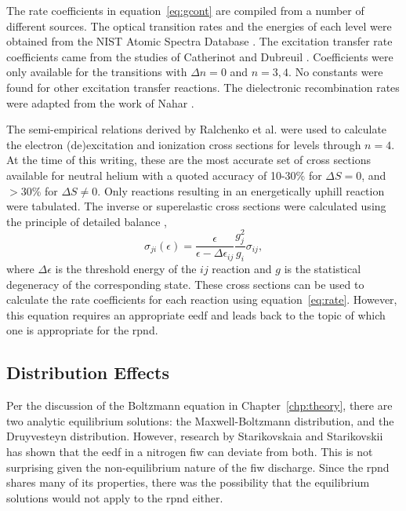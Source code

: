 The rate coefficients in equation~\ref{eq:gcont} are compiled from a number of
different sources. The optical transition rates and the energies of each level
were obtained from the NIST Atomic Spectra Database \cite{Kramida2012}. The
excitation transfer rate coefficients came from the studies of Catherinot and
Dubreuil \cite{Catherinot1981, Dubreuil1980}. Coefficients were only available
for the transitions with $\Delta n=0$ and $n=3,4$. No constants were found for
other excitation transfer reactions. The dielectronic recombination rates were
adapted from the work of Nahar \cite{Nahar2010}.

The semi-empirical relations derived by Ralchenko et al. \cite{Ralchenko2008}
were used to calculate the electron (de)excitation and ionization cross sections
for levels through $n=4$. At the time of this writing, these are the most
accurate set of cross sections available for neutral helium with a quoted
accuracy of 10-30\% for $\Delta S=0$, and $>30$\% for $\Delta S \neq 0$. Only
reactions resulting in an energetically uphill reaction were tabulated. The
inverse or superelastic cross sections were calculated using the principle of
detailed balance \cite{Kunze2009},
\begin{equation}
  \sigma_{ji}(\epsilon) = \frac{\epsilon}{\epsilon - \Delta\epsilon_{ij}}
    \frac{g_j^2}{g_i}\sigma_{ij},
\end{equation}
where $\Delta\epsilon$ is the threshold energy of the $ij$ reaction and $g$ is
the statistical degeneracy of the corresponding state. These cross sections can
be used to calculate the rate coefficients for each reaction using
equation~\ref{eq:rate}. However, this equation requires an appropriate
\acs{eedf} and leads back to the topic of which one is appropriate for the
\acs{rpnd}.

\subsection{Distribution Effects}\label{sec:dists}

Per the discussion of the Boltzmann equation in Chapter~\ref{chp:theory}, there
are two analytic equilibrium solutions: the Maxwell-Boltzmann distribution, and
the Druyvesteyn distribution. However, research by Starikovskaia and
Starikovskii \cite{Starikovskaia2001a} has shown that the \acs{eedf} in a
nitrogen \acs{fiw} can deviate from both. This is not surprising given the
non-equilibrium nature of the \acs{fiw} discharge. Since the \acs{rpnd} shares
many of its properties, there was the possibility that the equilibrium solutions
would not apply to the \acs{rpnd} either.

